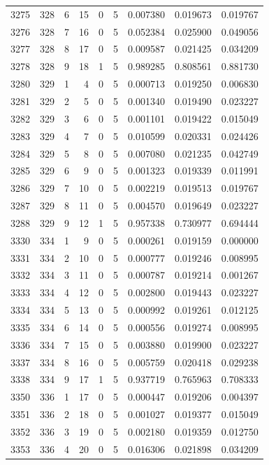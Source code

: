 \begin{longtable}{rrrrrrrrr}
3275 & 328 & 6 & 15 & 0 & 5 & 0.007380 & 0.019673 & 0.019767 \\
3276 & 328 & 7 & 16 & 0 & 5 & 0.052384 & 0.025900 & 0.049056 \\
3277 & 328 & 8 & 17 & 0 & 5 & 0.009587 & 0.021425 & 0.034209 \\
3278 & 328 & 9 & 18 & 1 & 5 & 0.989285 & 0.808561 & 0.881730 \\
3280 & 329 & 1 & 4 & 0 & 5 & 0.000713 & 0.019250 & 0.006830 \\
3281 & 329 & 2 & 5 & 0 & 5 & 0.001340 & 0.019490 & 0.023227 \\
3282 & 329 & 3 & 6 & 0 & 5 & 0.001101 & 0.019422 & 0.015049 \\
3283 & 329 & 4 & 7 & 0 & 5 & 0.010599 & 0.020331 & 0.024426 \\
3284 & 329 & 5 & 8 & 0 & 5 & 0.007080 & 0.021235 & 0.042749 \\
3285 & 329 & 6 & 9 & 0 & 5 & 0.001323 & 0.019339 & 0.011991 \\
3286 & 329 & 7 & 10 & 0 & 5 & 0.002219 & 0.019513 & 0.019767 \\
3287 & 329 & 8 & 11 & 0 & 5 & 0.004570 & 0.019649 & 0.023227 \\
3288 & 329 & 9 & 12 & 1 & 5 & 0.957338 & 0.730977 & 0.694444 \\
3330 & 334 & 1 & 9 & 0 & 5 & 0.000261 & 0.019159 & 0.000000 \\
3331 & 334 & 2 & 10 & 0 & 5 & 0.000777 & 0.019246 & 0.008995 \\
3332 & 334 & 3 & 11 & 0 & 5 & 0.000787 & 0.019214 & 0.001267 \\
3333 & 334 & 4 & 12 & 0 & 5 & 0.002800 & 0.019443 & 0.023227 \\
3334 & 334 & 5 & 13 & 0 & 5 & 0.000992 & 0.019261 & 0.012125 \\
3335 & 334 & 6 & 14 & 0 & 5 & 0.000556 & 0.019274 & 0.008995 \\
3336 & 334 & 7 & 15 & 0 & 5 & 0.003880 & 0.019900 & 0.023227 \\
3337 & 334 & 8 & 16 & 0 & 5 & 0.005759 & 0.020418 & 0.029238 \\
3338 & 334 & 9 & 17 & 1 & 5 & 0.937719 & 0.765963 & 0.708333 \\
3350 & 336 & 1 & 17 & 0 & 5 & 0.000447 & 0.019206 & 0.004397 \\
3351 & 336 & 2 & 18 & 0 & 5 & 0.001027 & 0.019377 & 0.015049 \\
3352 & 336 & 3 & 19 & 0 & 5 & 0.002180 & 0.019359 & 0.012750 \\
3353 & 336 & 4 & 20 & 0 & 5 & 0.016306 & 0.021898 & 0.034209 \\

\end{longtable}
